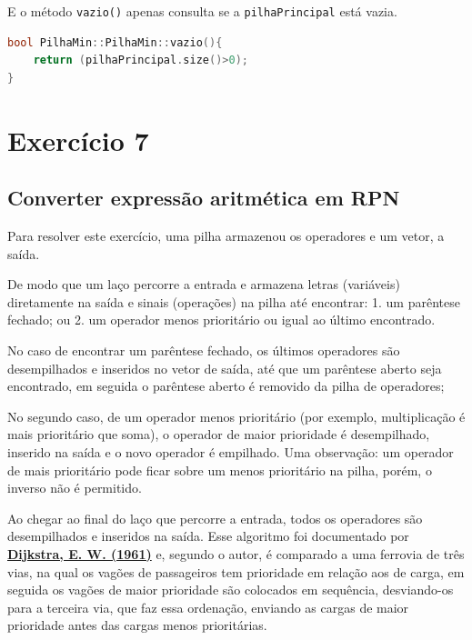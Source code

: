 \documentclass[
  brazilian,
  paper=a4,
  oneside  ,captions=tableheading
]{scrbook}
\newcommand{\passthrough}[1]{#1}
\begin{document}
E o método \passthrough{\lstinline!vazio()!} apenas consulta se a
\passthrough{\lstinline!pilhaPrincipal!} está vazia.

\begin{lstlisting}[language={C++}]
bool PilhaMin::PilhaMin::vazio(){
    return (pilhaPrincipal.size()>0);
}
\end{lstlisting}

\hypertarget{exercuxedcio-7}{%
\chapter{Exercício 7}\label{exercuxedcio-7}}

\hypertarget{converter-expressuxe3o-aritmuxe9tica-em-rpn}{%
\section{Converter expressão aritmética em
RPN}\label{converter-expressuxe3o-aritmuxe9tica-em-rpn}}

Para resolver este exercício, uma pilha armazenou os operadores e um
vetor, a saída.

De modo que um laço percorre a entrada e armazena letras (variáveis)
diretamente na saída e sinais (operações) na pilha até encontrar: 1. um
parêntese fechado; ou 2. um operador menos prioritário ou igual ao
último encontrado.

No caso de encontrar um parêntese fechado, os últimos operadores são
desempilhados e inseridos no vetor de saída, até que um parêntese aberto
seja encontrado, em seguida o parêntese aberto é removido da pilha de
operadores;

No segundo caso, de um operador menos prioritário (por exemplo,
multiplicação é mais prioritário que soma), o operador de maior
prioridade é desempilhado, inserido na saída e o novo operador é
empilhado. Uma observação: um operador de mais prioritário pode ficar
sobre um menos prioritário na pilha, porém, o inverso não é permitido.

Ao chegar ao final do laço que percorre a entrada, todos os operadores
são desempilhados e inseridos na saída. Esse algoritmo foi documentado
por
\href{https://www.cs.utexas.edu/~EWD/MCReps/MR35.PDF}{\textbf{Dijkstra,
E. W. (1961)}} e, segundo o autor, é comparado a uma ferrovia de três
vias, na qual os vagões de passageiros tem prioridade em relação aos de
carga, em seguida os vagões de maior prioridade são colocados em
sequência, desviando-os para a terceira via, que faz essa ordenação,
enviando as cargas de maior prioridade antes das cargas menos
prioritárias.
\end{document}
